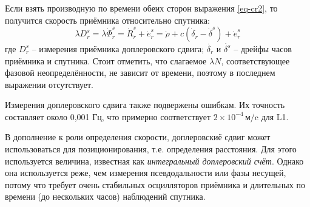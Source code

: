 Если взять производную по времени обеих сторон выражения \eqref{eq-cr2}, то получится скорость приёмника относительно спутника:
\begin{equation}
\lambda D_r^s=\lambda\dot{\Phi}_r^s=\dot{R}_r^s+\dot{e}_r^s=\dot{\rho}+c(\dot{\delta}_r-\dot{\delta}^s)+\dot{e}_r^s     
\end{equation}
где 
$D_r^s$ -- измерения приёмника доплеровского сдвига;
$\dot{\delta_r}$ и $\dot{\delta^s}$ -- дрейфы часов приёмника и спутника.
Стоит отметить, что слагаемое $\lambda N$, соответствующее фазовой неопределённости, не зависит от времени, поэтому в последнем выражении отсутствует.

Измерения доплеровского сдвига также подвержены ошибкам. 
Их точность составляет около 0,001 Гц, что примерно соответствует $2\times10^{-4}\,\text{м/c}$ для L1.

В дополнение к роли определения скорости, доплеровскиё сдвиг может использоваться для позиционирования, т.е. определения расстояния.
Для этого используется величина, известная как \textit{интегральный доплеровский счёт}.
Однако она используется реже, чем измерения псевдодальности или фазы несущей, потому что требует очень стабильных осцилляторов приёмника и длительных по времени (до нескольких часов) наблюдений спутника. 